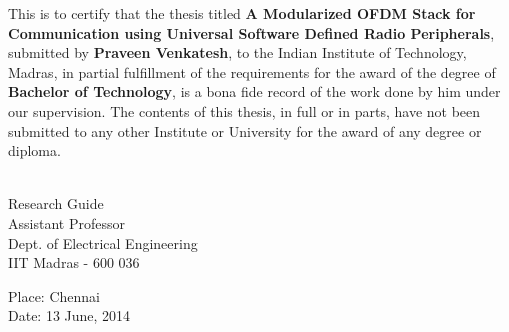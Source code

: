 \certificate

\vspace*{0.5in}

\noindent This is to certify that the thesis titled {\bf A Modularized OFDM
Stack for Communication using Universal Software Defined Radio Peripherals},
submitted by {\bf Praveen Venkatesh}, to the Indian Institute of Technology,
Madras, in partial fulfillment of the requirements for the award of the degree
of {\bf Bachelor of Technology}, is a bona fide record of the work done by him
under our supervision. The contents of this thesis, in full or in parts, have
not been submitted to any other Institute or University for the award of any
degree or diploma.

\vspace*{1.5in}

\begin{singlespacing}
\hspace*{-0.25in}
\parbox{2.5in}{
	 \\
	\noindent Research Guide \\
	\noindent Assistant Professor \\
	\noindent Dept. of Electrical Engineering\\
	\noindent IIT Madras - 600 036 \\
}
\hspace*{1.0in}
\end{singlespacing}

\vspace*{0.25in}

\noindent Place: Chennai \\
Date: 13 June, 2014

